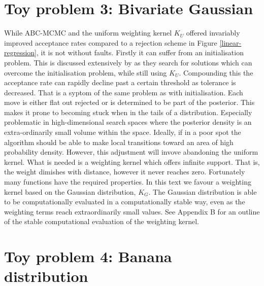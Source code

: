 \section{Toy problem 3: Bivariate Gaussian}


While ABC-MCMC and the uniform weighting kernel $K_U$ offered invariably improved acceptance rates compared to a rejection scheme in Figure \ref{linear-regression}, it is not without faults. Firstly it can suffer from an initialisation problem. This is discussed extensively by \citep{Sisson2010a} as they search for solutions which can overcome the initialisation problem, while still using $K_U$. Compounding this the acceptance rate can rapidly decline past a certain threshold as tolerance is decreased. That is a syptom of the same problem as with initialisation. Each move is either flat out rejected or is determined to be part of the posterior. This makes it prone to becoming stuck when in the tails of a distribution. Especially problematic in high-dimensional search spaces where the posterior density is an extra-ordinarily small volume within the space. Ideally, if in a poor spot the algorithm should be able to make local transitions toward an area of high probability density. However, this adjustment will invove abandoning the uniform kernel. What is needed is a weighting kernel which offers infinite support. That is, the weight dimishes with distance, however it never reaches zero. Fortunately many functions have the required properties. In this text we favour a  weighting kernel based on the Gaussian distribution, $K_G$. The Gaussian distribution is able to be computationally evaluated in a computationally stable way, even as the weighting terms reach extraordinarily small values. See Appendix B for an outline of the stable computational evaluation of the weighting kernel. 

\section{Toy problem 4: Banana distribution}



 
